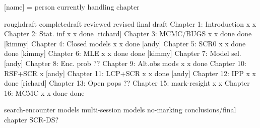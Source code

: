 [name] = person currently handling chapter


                          roughdraft   completedraft  reviewed  revised            final draft
Chapter 1: Introduction       x              x
Chapter 2: Stat. inf          x              x         done     [richard]
Chapter 3: MCMC/BUGS          x              x         done      done    [kimmy]
Chapter 4: Closed models      x              x         done     [andy]
Chapter 5: SCR0               x              x         done      done    [kimmy]
Chapter 6: MLE                x              x         done      done    [kimmy]
Chapter 7: Model sel.       [andy]
Chapter 8: Enc. prob        ??
Chapter 9: Alt.obs mods       x              x         done    
Chapter 10: RSF+SCR           x           [andy]
Chapter 11: LCP+SCR           x              x         done     [andy]
Chapter 12: IPP               x              x         done     [richard]
Chapter 13: Open pops       ??
Chapter 15: mark-resight      x              x        
Chapter 16: MCMC              x              x         done      done


search-encounter models
multi-session models
no-marking 
conclusions/final chapter
SCR-DS?


